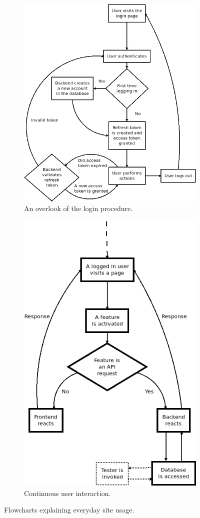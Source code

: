 \begin{figure}[H]
    \centering
    \begin{subfigure}{.45\linewidth}
    \centering
    \includegraphics[width=.7\linewidth]{img/login_flowchart.png}
    \caption{An overlook of the login procedure.}
    \end{subfigure}
    \begin{subfigure}{.45\linewidth}
    \centering
    \includegraphics[width=.7\linewidth]{img/user_interaction.png}
    \caption{Continuous user interaction.}
    \end{subfigure}
    \caption{Flowcharts explaining everyday site usage.}\label{fig:common_flow}
\end{figure}
